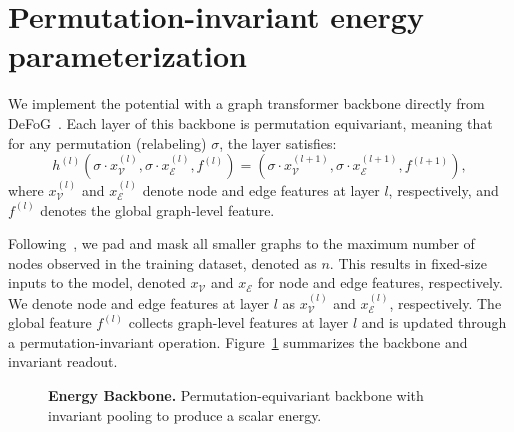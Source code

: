 \section{Permutation-invariant energy parameterization}\label{app:perm-invariance}
We implement the potential with a graph transformer backbone directly from DeFoG~\cite{qinmadeira2024defog}. Each layer of this backbone is permutation equivariant, meaning that for any permutation (relabeling) $\sigma$, the layer satisfies:
\[
h^{(l)}(\sigma \cdot x_{\mathcal{V}}^{(l)}, \sigma \cdot x_{\mathcal{E}}^{(l)}, f^{(l)}) = (\sigma \cdot x_{\mathcal{V}}^{(l+1)}, \sigma \cdot x_{\mathcal{E}}^{(l+1)}, f^{(l+1)}),
\]
where $x_{\mathcal{V}}^{(l)}$ and $x_{\mathcal{E}}^{(l)}$ denote node and edge features at layer $l$, respectively, and $f^{(l)}$ denotes the global graph-level feature.

Following~\citep{vignac2022digress,qinmadeira2024defog}, we pad and mask all smaller graphs to the maximum number of nodes observed in the training dataset, denoted as $n$. This results in fixed-size inputs to the model, denoted $x_\mathcal{V}$ and $x_\mathcal{E}$ for node and edge features, respectively. We denote node and edge features at layer $l$ as $x^{(l)}_\mathcal{V}$ and $x^{(l)}_\mathcal{E}$, respectively.
The global feature $f^{(l)}$ collects graph-level features at layer $l$ and is updated through a permutation-invariant operation.
Figure~\ref{fig:energy-arch} summarizes the backbone and invariant readout.


\begin{figure}[h]
\centering
{}
\caption{\textbf{Energy Backbone.} Permutation-equivariant backbone with invariant pooling to produce a scalar energy.}
\label{fig:energy-arch}
\end{figure}

